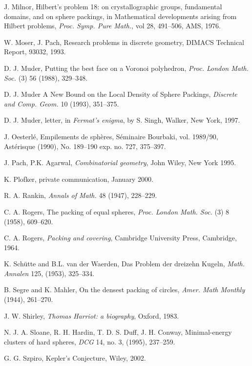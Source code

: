 \begin{thebibliography}{CHMS94}
 J. Milnor, Hilbert's problem 18: on crystallographic groups,
    fundamental domains, and on sphere packings, in
    Mathematical developments arising from Hilbert problems,
    {\it Proc. Symp. Pure Math.}, vol 28, 491--506, AMS, 1976.

 W. Moser, J. Pach, Research problems in discrete geometry,
    DIMACS Technical Report, 93032, 1993.

 D. J. Muder, Putting the best face on a Voronoi polyhedron,
    {\it Proc. London Math. Soc.} (3) 56 (1988), 329--348.


  D. J. Muder A New Bound on the Local Density
of Sphere Packings, {\it Discrete and Comp. Geom.} 10 (1993),
351--375.

  D. J. Muder, letter, in {\it Fermat's enigma}, by S. Singh,
        Walker, New York, 1997.

 J. Oesterl\'e,  Empilements de sph\`eres,
    S\'eminaire Bourbaki, vol. 1989/90, Ast\'erisque (1990),
        No. 189--190 exp. no. 727, 375--397.

 J. Pach, P.K. Agarwal, {\it Combinatorial geometry}, John Wiley,
    New York 1995.

  K. Plofker, private communication, January 2000.

 R. A. Rankin, {\it Annals of Math.} 48 (1947), 228--229.

 C. A. Rogers, The packing of equal spheres, {\it Proc. London Math.
    Soc.} (3) 8 (1958), 609--620.

 C. A. Rogers, {\it Packing and covering}, Cambridge University Press,
    Cambridge, 1964.

 K. Sch\"utte and B.L. van der Waerden, Das
Problem der dreizehn Kugeln, {\it Math. Annalen} 125, (1953),
325--334.

 B. Segre and K. Mahler, On the densest packing of
    circles, {\it Amer. Math Monthly} (1944), 261--270.

 J. W. Shirley,
{\it Thomas Harriot: a biography}, Oxford, 1983.

 N. J. A. Sloane, R. H. Hardin, T. D. S. Duff, J. H. Conway,
    Minimal-energy clusters of hard spheres,
    {\it DCG} 14,  no. 3, (1995), 237--259.

 G. G. Szpiro, Kepler's Conjecture, Wiley, 2002.


\end{thebibliography}
